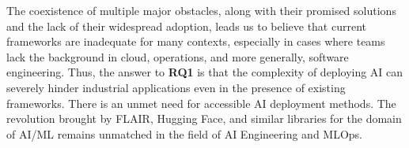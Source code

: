 The coexistence of multiple major obstacles, along with their promised solutions and the lack of their widespread adoption, leads us to believe that current frameworks are inadequate for many contexts, especially in cases where teams lack the background in cloud, operations, and more generally, software engineering. Thus, the answer to \textbf{RQ1} is that the complexity of deploying AI can severely hinder industrial applications even in the presence of existing frameworks. There is an unmet need for accessible AI deployment methods. The revolution brought by FLAIR, Hugging Face, and similar libraries for the domain of AI/ML remains unmatched in the field of AI Engineering and MLOps.
